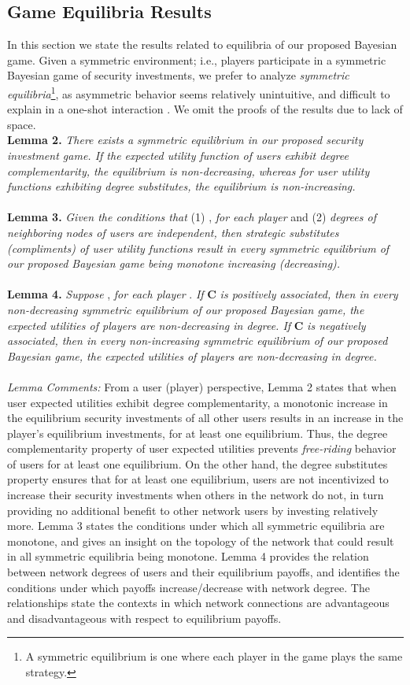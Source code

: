 \documentclass[letterpaper,12pt,onecolumn, nodraft]{IEEEtran}
\begin{document}
\subsection{Game Equilibria Results}
In this section we state the results related to equilibria of our proposed Bayesian game. Given a symmetric environment; i.e., players participate in a symmetric Bayesian game of security investments, we prefer to analyze \emph{symmetric equilibria}\footnote{A symmetric equilibrium is one where each player in the game plays the same strategy.}, as asymmetric behavior seems relatively unintuitive, and difficult to explain in a one-shot interaction \cite{kreps}. We omit the proofs of the results due to lack of space. \\ 
\textbf{Lemma 2.} \emph{There exists a symmetric equilibrium in our proposed security investment game. If the expected utility function of users exhibit degree complementarity, the equilibrium is non-decreasing, whereas for user utility functions exhibiting degree substitutes, the equilibrium is non-increasing.}\\ \\
\textbf{Lemma 3.} \emph{Given the conditions that} (1) , \emph{for each player}  and (2) \emph{degrees of neighboring nodes of users are independent, then strategic substitutes (compliments) of user utility functions result in every symmetric equilibrium of our proposed Bayesian game being monotone increasing (decreasing).}  \\ \\
\textbf{Lemma 4.}  \emph{Suppose} , \emph{for each player} . \emph{If} \textbf{C} \emph{is positively associated, then in every non-decreasing symmetric equilibrium of our proposed Bayesian game, the expected utilities of players are non-decreasing in degree. If} \textbf{C} \emph{is negatively associated, then in every non-increasing symmetric equilibrium of our proposed Bayesian game, the expected utilities of players are non-decreasing in degree.} \\ \\
\emph{Lemma Comments:} From a user (player) perspective, Lemma 2 states that when user expected utilities exhibit degree complementarity, a monotonic increase in the equilibrium security investments of all other users results in an increase in the player's equilibrium investments, for at least one equilibrium. Thus, the degree complementarity property of user expected utilities prevents \emph{free-riding} behavior of users for at least one equilibrium. On the other hand, the degree substitutes property ensures that for at least one equilibrium, users are not incentivized to increase their security investments when others in the network do not, in turn providing no additional benefit to other network users by investing relatively more. Lemma 3 states the conditions under which all symmetric equilibria are monotone, and gives an insight on the topology of the network that could result in all symmetric equilibria being monotone. Lemma 4 provides the relation between network degrees of users and their equilibrium payoffs, and identifies the conditions under which payoffs increase/decrease with network degree. The relationships state the contexts in which network connections are advantageous and disadvantageous with respect to equilibrium payoffs. 
\end{document}

